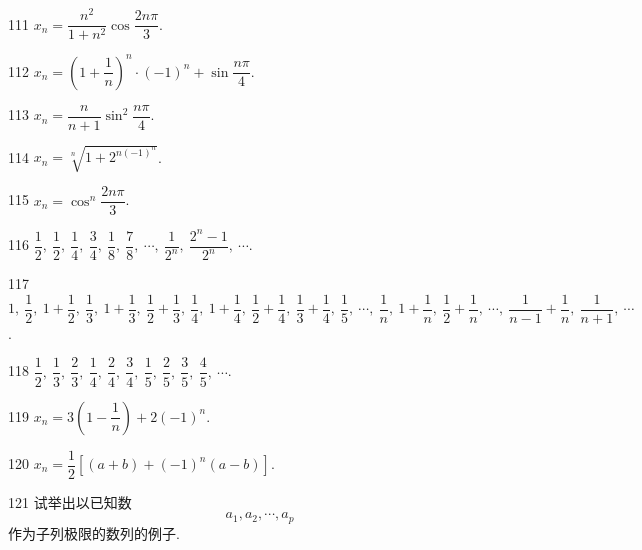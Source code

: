 \begin{prob}[S]{111}
$x_n = \dfrac{n^2}{1+n^2}\cos\dfrac{2n\pi}{3}$.
\end{prob}

\begin{prob}[S]{112}
$x_n = \left(1 + \dfrac{1}{n}\right)^n \cdot (-1)^n + \sin\dfrac{n\pi}{4}$.
\end{prob}

\begin{prob}[S]{113}
$x_n = \dfrac{n}{n+1}\sin^2\dfrac{n\pi}{4}$.
\end{prob}

\begin{prob}[S]{114}
$x_n = \sqrt[n]{1 + 2^{n(-1)^n}}$.
\end{prob}

\begin{prob}[S]{115}
$x_n = \cos^n\dfrac{2n\pi}{3}$.
\end{prob}


\begin{prob}[S]{116}
$\dfrac{1}{2},\ \dfrac{1}{2},\ \dfrac{1}{4},\ \dfrac{3}{4},\ \dfrac{1}{8},\ \dfrac{7}{8},\ \cdots,\ \dfrac{1}{2^n},\ \dfrac{2^n-1}{2^n},\ \cdots$.
\end{prob}

\begin{prob}[S]{117}
$1,\ \dfrac{1}{2},\ 1+\dfrac{1}{2},\ \dfrac{1}{3},\ 1+\dfrac{1}{3},\ \dfrac{1}{2}+\dfrac{1}{3},\ \dfrac{1}{4},\ 1+\dfrac{1}{4},\ \dfrac{1}{2}+\dfrac{1}{4},\ \dfrac{1}{3}+\dfrac{1}{4},\ \dfrac{1}{5},\ \cdots,\ \dfrac{1}{n},\ 1+\dfrac{1}{n},\ \dfrac{1}{2}+\dfrac{1}{n},\ \cdots,\ \dfrac{1}{n-1}+\dfrac{1}{n},\ \dfrac{1}{n+1},\ \cdots$.
\end{prob}

\begin{prob}[S]{118}
$\dfrac{1}{2},\ \dfrac{1}{3},\ \dfrac{2}{3},\ \dfrac{1}{4},\ \dfrac{2}{4},\ \dfrac{3}{4},\ \dfrac{1}{5},\ \dfrac{2}{5},\ \dfrac{3}{5},\ \dfrac{4}{5},\ \cdots$.
\end{prob}

\begin{prob}[S]{119}
$x_n = 3\left(1 - \dfrac{1}{n}\right) + 2(-1)^n$.
\end{prob}

\begin{prob}[S]{120}
$x_n = \dfrac{1}{2}[(a+b) + (-1)^n(a-b)]$.
\end{prob}

\begin{prob}[M]{121}
试举出以已知数
\[
a_1, a_2, \cdots, a_p
\]
作为子列极限的数列的例子.
\end{prob}

